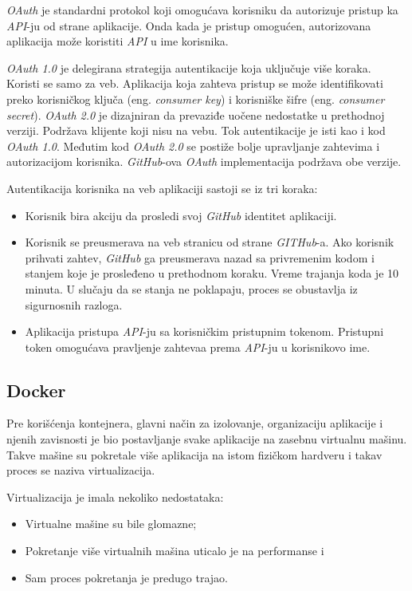 \textit{OAuth} je standardni protokol koji omogućava korisniku da autorizuje pristup ka \textit{API}-ju 
od strane aplikacije. Onda kada je pristup omogućen, autorizovana aplikacija može koristiti 
\textit{API} u ime korisnika.

\textit{OAuth 1.0} je delegirana strategija autentikacije koja uključuje više koraka. 
Koristi se samo za veb. Aplikacija koja zahteva pristup se može identifikovati preko korisničkog 
ključa (eng. \textit{consumer key}) i korisniške šifre (eng. \textit{consumer secret}).
\textit{OAuth 2.0} je dizajniran da prevaziđe uočene nedostatke u prethodnoj verziji. 
Podržava klijente koji nisu na vebu. Tok autentikacije je isti kao i kod \textit{OAuth 1.0}. 
Međutim kod \textit{OAuth 2.0} se postiže bolje upravljanje zahtevima i autorizacijom korisnika.
\textit{GitHub}-ova \textit{OAuth} implementacija podržava obe verzije.

Autentikacija korisnika na veb aplikaciji sastoji se iz tri koraka:
\begin{itemize}
    \item Korisnik bira akciju da prosledi svoj \textit{GitHub} identitet aplikaciji.
    \item Korisnik se preusmerava na veb stranicu od strane \textit{GITHub}-a.
        Ako korisnik prihvati zahtev, \textit{GitHub} ga preusmerava nazad sa privremenim kodom i stanjem 
        koje je prosleđeno u prethodnom koraku. Vreme trajanja koda je 10 minuta. U slučaju da 
        se stanja ne poklapaju, proces se obustavlja iz sigurnosnih razloga.
    \item Aplikacija pristupa \textit{API}-ju sa korisničkim pristupnim tokenom. 
        Pristupni token omogućava pravljenje zahtevaa prema \textit{API}-ju u korisnikovo ime.
\end{itemize}

\subsection{Docker}\label{sec:docker}

Pre korišćenja kontejnera, glavni način za izolovanje, organizaciju aplikacije i njenih zavisnosti je 
bio postavljanje svake aplikacije na zasebnu virtualnu mašinu. Takve mašine su pokretale više aplikacija 
na istom fizičkom hardveru i takav proces se naziva virtualizacija.

Virtualizacija je imala nekoliko nedostataka: 
\begin{itemize}
    \item Virtualne mašine su bile glomazne;
    \item Pokretanje više virtualnih mašina uticalo je na performanse i
    \item Sam proces pokretanja je predugo trajao.
\end{itemize}

